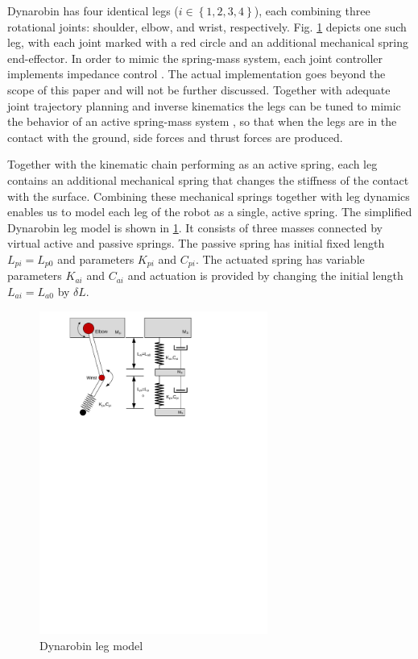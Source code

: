 

Dynarobin has four identical legs ($i\in \left \{ 1,2,3,4 \right \}$), each combining three rotational joints: shoulder, elbow, and wrist, respectively. Fig. \ref{fig:DynarobinLEG} depicts one such leg, with each joint marked with a red circle and an additional mechanical spring end-effector. In order to mimic the spring-mass system, each joint controller implements impedance control \cite{citeulike:2203614}. The actual implementation goes beyond the scope of this paper and will not be further discussed. Together with adequate joint trajectory planning and inverse kinematics the legs can be tuned to mimic the behavior of an active spring-mass system \cite{conf/iros/ParkP12}\cite{6171868}, so that when the legs are in the contact with the ground, side forces and thrust forces are produced.

Together with the kinematic chain performing as an active spring, each leg contains an additional mechanical spring that changes the stiffness of the contact with the surface. Combining these mechanical springs together with leg dynamics enables us to model each leg of the robot as a single, active spring. The simplified Dynarobin leg model is shown in \ref{fig:DynarobinLEG}. It consists of three masses connected by virtual active and passive springs. The passive spring has initial fixed length $L_{pi}=L_{p0}$ and parameters $K_{pi}$ and $C_{pi}$.  The actuated spring has variable parameters $K_{ai}$ and $C_{ai}$ and actuation is provided by changing the initial length $L_{ai}=L_{a0}$ by $\delta L$.
\begin{figure}[t!]
	\centering
	\includegraphics[width=75mm]{./pictures/Dynarobin_leg.pdf}
	\caption{Dynarobin leg model}
	\label{fig:DynarobinLEG}
\end{figure}
